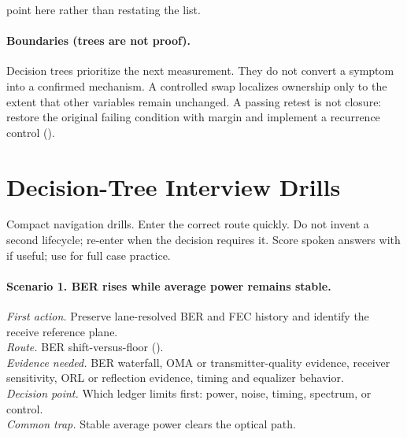 point here rather than restating the list.

\paragraph{Boundaries (trees are not proof).}
Decision trees prioritize the next measurement. They do not convert a symptom
into a confirmed mechanism. A controlled swap localizes ownership only to the
extent that other variables remain unchanged. A passing retest is not closure:
restore the original failing condition with margin and implement a recurrence
control ().

\section{Decision-Tree Interview Drills}
\label{sec:tree-interview-drills}

Compact navigation drills. Enter the correct route quickly. Do not invent a
second lifecycle; re-enter  when the
decision requires it. Score spoken answers with
 if useful; use
 for full case practice.

\paragraph{Scenario 1. BER rises while average power remains stable.}
\textit{First action.} Preserve lane-resolved BER and FEC history and identify
the receive reference plane.\\
\textit{Route.} BER shift-versus-floor
().\\
\textit{Evidence needed.} BER waterfall, OMA or transmitter-quality evidence,
receiver sensitivity, ORL or reflection evidence, timing and equalizer
behavior.\\
\textit{Decision point.} Which ledger limits first: power, noise, timing,
spectrum, or control.\\
\textit{Common trap.} Stable average power clears the optical path.

